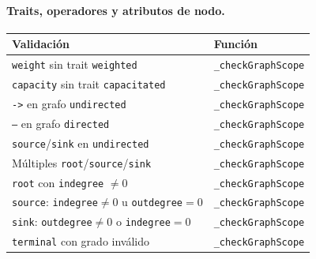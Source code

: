 \documentclass[11pt,a4paper]{article}
\newcommand{\code}[1]{\texttt{#1}}
\begin{document}
\paragraph{Traits, operadores y atributos de nodo.}
\begin{center}
\begin{tabular}{@{}ll@{}}
\toprule
\textbf{Validación} & \textbf{Función} \\
\midrule
\code{weight} sin trait \code{weighted}    & \code{\_checkGraphScope} \\
\code{capacity} sin trait \code{capacitated} & \code{\_checkGraphScope} \\
\code{->} en grafo \code{undirected}       & \code{\_checkGraphScope} \\
\code{--} en grafo \code{directed}         & \code{\_checkGraphScope} \\
\code{source}/\code{sink} en \code{undirected} & \code{\_checkGraphScope} \\
Múltiples \code{root}/\code{source}/\code{sink} & \code{\_checkGraphScope} \\
\code{root} con \code{indegree} $\neq 0$   & \code{\_checkGraphScope} \\
\code{source}: \code{indegree}$\neq 0$ u \code{outdegree}$=0$ & \code{\_checkGraphScope} \\
\code{sink}: \code{outdegree}$\neq 0$ o \code{indegree}$=0$ & \code{\_checkGraphScope} \\
\code{terminal} con grado inválido         & \code{\_checkGraphScope} \\
\bottomrule
\end{tabular}
\end{center}
\end{document}
